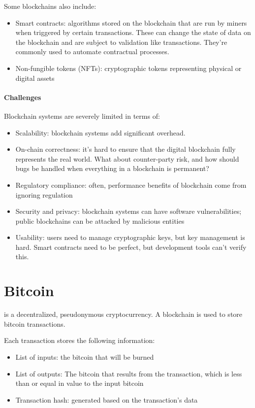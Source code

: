 Some blockchains also include:
\begin{itemize}
    \item Smart contracts: algorithms stored on the blockchain that are run by miners when triggered by certain transactions. These can change the state of data on the blockchain and are subject to validation like transactions. They're commonly used to automate contractual processes.
    \item Non-fungible tokens (NFTs): cryptographic tokens representing physical or digital assets
\end{itemize}

\paragraph{Challenges} Blockchain systems are severely limited in terms of:
\begin{itemize}
    \item Scalability: blockchain systems add significant overhead.
    \item On-chain correctness: it's hard to ensure that the digital blockchain fully represents the real world. What about counter-party risk, and how should bugs be handled when everything in a blockchain is permanent?
    \item Regulatory compliance: often, performance benefits of blockchain come from ignoring regulation
    \item Security and privacy: blockchain systems can have software vulnerabilities; public blockchains can be attacked by malicious entities
    \item Usability: users need to manage cryptographic keys, but key management is hard. Smart contracts need to be perfect, but development tools can't verify this.
\end{itemize}

\section{Bitcoin}

 is a decentralized, pseudonymous cryptocurrency. A blockchain is used to store bitcoin transactions.

Each transaction stores the following information:
\begin{itemize}
    \item List of inputs: the bitcoin that will be burned
    \item List of outputs: The bitcoin that results from the transaction, which is less than or equal in value to the input bitcoin
    \item Transaction hash: generated based on the transaction's data
\end{itemize}

